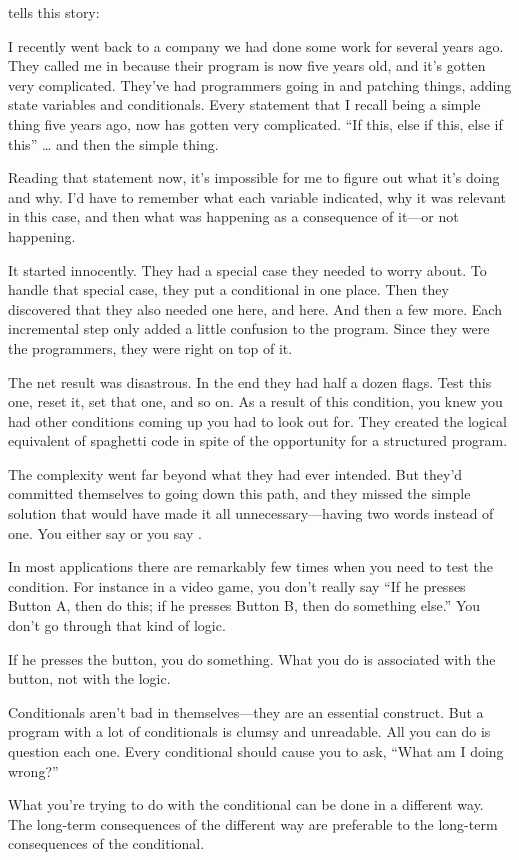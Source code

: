 \begin{interview}
 tells this story:
\begin{tfquot}
I recently went back to a company we had done some work for several years
ago. They called me in because their program is now five years old, and
it's gotten very complicated. They've had programmers going in and
patching things, adding state variables and conditionals. Every statement
that I recall being a simple thing five years ago, now has gotten very
complicated.  ``If this, else if this, else if this'' \dots{} and then the
simple thing.

Reading that statement now, it's impossible for me to figure out what it's
doing and why. I'd have to remember what each variable indicated, why it
was relevant in this case, and then what was happening as a consequence of
it---or not happening.

It started innocently. They had a special case they needed to worry about.
To handle that special case, they put a conditional in one place. Then they
discovered that they also needed one here, and here. And then a few more.
Each incremental step only added a little confusion to the program. Since
they were the programmers, they were right on top of it.

The net result was disastrous. In the end they had half a dozen flags.
Test this one, reset it, set that one, and so on. As a result of this
condition, you knew you had other conditions coming up you had to look out
for. They created the logical equivalent of spaghetti code in spite of the
opportunity for a structured program.

The complexity went far beyond what they had ever intended. But they'd
committed themselves to going down this path, and they missed the simple
solution that would have made it all unnecessary---having two words
instead of one. You either say  or you say .

In most applications there are remarkably few times when you need to test
the condition. For instance in a video game, you don't really say ``If he
presses Button A, then do this; if he presses Button B, then do something
else.'' You don't go through that kind of logic.

If he presses the button, you do something. What you do is associated with
the button, not with the logic.

Conditionals aren't bad in themselves---they are an essential construct. But
a program with a lot of conditionals is clumsy and unreadable. All you can
do is question each one. Every conditional should cause you to ask, ``What
am I doing wrong?''

What you're trying to do with the conditional can be done in a different
way. The long-term consequences of the different way are preferable to the
long-term consequences of the conditional.
\end{tfquot}
\end{interview}%
